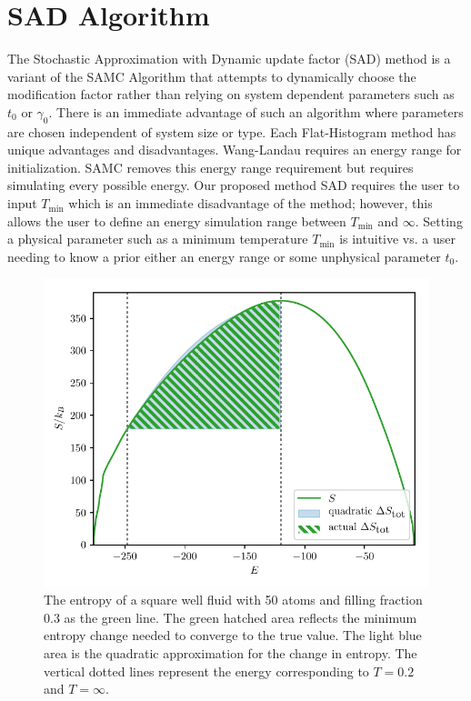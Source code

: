 \documentclass[letterpaper,twocolumn,amsmath,amssymb,pre,aps,10pt]{revtex4-1}
\begin{document}
\section{SAD Algorithm}\label{sec:sad}
The Stochastic Approximation with Dynamic update factor (SAD) method
is a variant of the SAMC
Algorithm that attempts to dynamically choose the modification factor
rather than relying on system dependent parameters such as $t_0$ or
$\gamma_0$.  There is an immediate advantage of such an algorithm where
parameters are chosen independent of system size or type. Each
Flat-Histogram method has unique advantages and disadvantages.
Wang-Landau requires an energy range for initialization.  SAMC removes
this energy range requirement but requires simulating every possible
energy. Our proposed method SAD requires the user to input
$T_\text{min}$ which is an immediate disadvantage of the method;
however, this allows the user to define an energy simulation
range between $T_\text{min}$ and $\infty$. Setting a physical parameter
such as a minimum temperature $T_\text{min}$ is intuitive vs. a user
needing to know a prior either an energy range or some unphysical
parameter $t_0$.

\begin{figure}
  \includegraphics[width=\columnwidth]{figs/N50-lndos-comparison}
  \caption{The entropy of a square well fluid with 50 atoms and filling fraction
        0.3 as the green line.  The green hatched area reflects the
        minimum entropy change needed to converge to the true value.
        The light blue area is the quadratic approximation
        for the change in entropy.  The vertical dotted lines represent
        the energy corresponding to $T=0.2$ and $T=\infty$.}
\end{figure}
\end{document}
